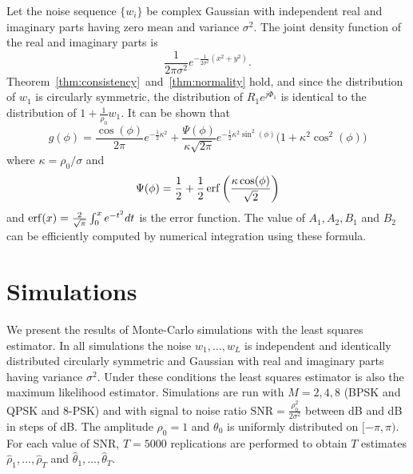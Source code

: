 \documentclass[journal]{IEEEtran}
\begin{document}
Let the noise sequence $\{w_i\}$ be complex Gaussian with independent real and imaginary parts having zero mean and variance $\sigma^2$.  The joint density function of the real and imaginary parts is
\[
\frac{1}{2\pi\sigma^2}e^{-\frac{1}{2\sigma^2}(x^2 + y^2)}.
\]
Theorem~\ref{thm:consistency}~and~\ref{thm:normality} hold, and since the distribution of $w_1$ is circularly symmetric, the distribution of $R_1e^{j\Phi_1}$ is identical to the distribution of $1 + \frac{1}{\rho_0} w_1$.
It can be shown that
\[
g(\phi) = \frac{\cos(\phi)}{2\pi}e^{-\frac{1}{2}\kappa^2} + \frac{\Psi(\phi)}{\kappa\sqrt{2\pi}}  e^{-\frac{1}{2}\kappa^2\sin^2(\phi)} \big(1 + \kappa^2\cos^2(\phi) \big)
\]
where $\kappa = \rho_0/\sigma$ and
\[
\Psi(\phi) = \frac{1}{2} + \frac{1}{2} \operatorname{erf}\left(\frac{\kappa \cos(\phi)}{\sqrt{2}}\right)
\]
and $\operatorname{erf}(x) = \frac{2}{\sqrt{\pi}}\int_0^{x} e^{-t^2} dt$ is the error function.  The value of $A_1, A_2, B_1$ and $B_2$ can be efficiently computed by numerical integration using these formula.


\section{Simulations}\label{sec:simulations}

We present the results of Monte-Carlo simulations with the least squares estimator.  In all simulations the noise $w_1,\dots,w_L$ is independent and identically distributed circularly symmetric and Gaussian with real and imaginary parts having variance $\sigma^2$.  Under these conditions the least squares estimator is also the maximum likelihood estimator.  Simulations are run with $M=2,4,8$ (BPSK and QPSK and $8$-PSK) and with signal to noise ratio $\text{SNR} = \tfrac{\rho_0^2}{2\sigma^2}$ between \unit[-20]{dB} and \unit[20]{dB} in steps of \unit[1]{dB}.  The amplitude $\rho_0=1$ and $\theta_0$ is uniformly distributed on $[-\pi, \pi)$.  For each value of SNR, $T = 5000$ replications are performed to obtain $T$ estimates $\hat{\rho}_1, \dots, \hat{\rho}_T$ and $\hat{\theta}_1, \dots, \hat{\theta}_T$.  
\end{document}
